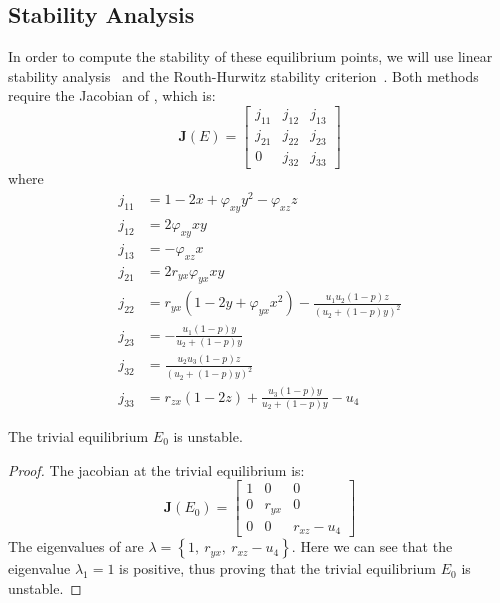 \subsection{Stability Analysis}\label{subsec:stability-analysis}
In order to compute the stability of these equilibrium points, we will use linear stability analysis~\cite{Strogatz9780813349107} and the Routh-Hurwitz stability criterion~\cite{YANG2002615621}.
Both methods require the Jacobian of , which is:
\begin{equation}\label{matrix:jacobian-model}
    \textbf{J}\left(E\right) = \begin{bmatrix}
        j_{11} & j_{12} & j_{13}\\
        j_{21} & j_{22} & j_{23}\\
        0 & j_{32} & j_{33}
    \end{bmatrix}
\end{equation}
where
\begin{align*}
    j_{11} &= 1-2x+\varphi_{xy}y^2-\varphi_{xz}z\\
    j_{12} &= 2\varphi_{xy}xy\\
    j_{13} &= -\varphi_{xz}x\\
    j_{21} &= 2r_{yx}\varphi_{yx}xy\\
    j_{22} &= r_{yx}\left(1-2y+\varphi_{yx}x^2\right)-\frac{u_1u_2\left(1-p\right)z}{\left(u_2+\left(1-p\right)y\right)^2}\\
    j_{23} &= -\frac{u_1\left(1-p\right)y}{u_2+\left(1-p\right)y}\\
    j_{32} &= \frac{u_2u_3\left(1-p\right)z}{\left(u_2+\left(1-p\right)y\right)^2}\\
    j_{33} &= r_{zx}\left(1-2z\right)+\frac{u_3\left(1-p\right)y}{u_2+\left(1-p\right)y}-u_4
\end{align*}
\begin{theorem}\label{thm:trivial-stability}
    The trivial equilibrium $E_0$ is unstable.
\end{theorem}
\begin{proof}
    The jacobian at the trivial equilibrium is:
    \begin{equation}\label{matrix:jacobian-trivial}
        \textbf{J}\left(E_0\right) = \begin{bmatrix}
            1 & 0 & 0\\
            0 & r_{yx} & 0\\
            0 & 0 & r_{xz}-u_4
        \end{bmatrix}
    \end{equation}
    The eigenvalues of  are $\lambda=\left\{1,\ r_{yx},\ r_{xz}-u_4\right\}$.
    Here we can see that the eigenvalue $\lambda_1=1$ is positive, thus proving that the trivial equilibrium $E_0$ is unstable.
\end{proof}
